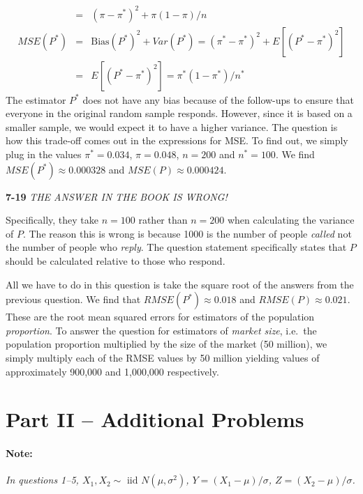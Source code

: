 \documentclass[addpoints,12pt]{exam}\usepackage[]{graphicx}\usepackage[]{color}
\begin{document}
\begin{questions}
\begin{solution}
\begin{eqnarray*}
		&=&  (\pi - \pi^*)^2 + \pi(1-\pi)/n\\
		MSE(P^*)	&=& \mbox{Bias}(P^*)^2 + Var(P^*) = (\pi^* - \pi^*)^2 + E[(P^* - \pi^*)^2]\\
			&=& E[(P^* - \pi^*)^2] = \pi^*(1-\pi^*)/n^*
	\end{eqnarray*}
The estimator $P^*$ does not have any bias because of the follow-ups to ensure that everyone in the original random sample responds. However, since it is based on a smaller sample, we would expect it to have a higher variance. The question is how this trade-off comes out in the expressions for MSE. To find out, we simply plug in the values $\pi^* = 0.034$, $\pi = 0.048$, $n =200$ and $n^* = 100$. We find $MSE(P^*) \approx 0.000328$ and $MSE(P) \approx 0.000424$.
    \end{solution}
  \item[]
    \begin{solution}
    \textbf{7-19} \emph{THE ANSWER IN THE BOOK IS WRONG!} 

\noindent Specifically, they take $n=100$ rather than $n = 200$ when calculating the variance of $P$. The reason this is wrong is because 1000 is the number of people \emph{called} not the number of people who \emph{reply}. The question statement specifically states that $P$ should be calculated relative to  those who respond.

All we have to do in this question is take the square root of the answers from the previous question. We find that $RMSE(P^*) \approx 0.018$ and $RMSE(P) \approx 0.021$. These are the root mean squared errors for estimators of the population \emph{proportion}. To answer the question for estimators of \emph{market size}, i.e.\ the population proportion multiplied by the size of the market (50 million), we simply multiply each of the RMSE values by 50 million yielding values of approximately 900,000 and 1,000,000 respectively.

    \end{solution}
\end{questions}

\section*{Part II -- Additional Problems}

\noindent \paragraph{Note:} \emph{In questions 1--5,  $X_1, X_2 \sim \mbox{ iid } N(\mu, \sigma^2)$, $Y = (X_1 - \mu)/\sigma$, $Z = (X_2 - \mu)/\sigma$.}
\end{document}
